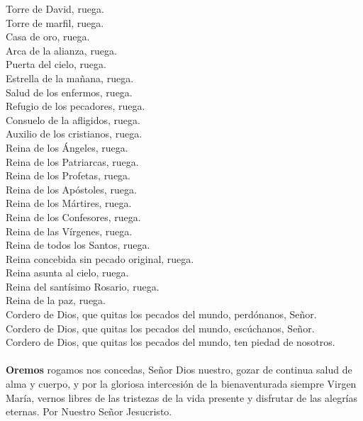 Torre de David, ruega.\\
Torre de marfil, ruega.\\
Casa de oro, ruega.\\
Arca de la alianza, ruega.\\
Puerta del cielo, ruega.\\
Estrella de la mañana, ruega.\\
Salud de los enfermos, ruega.\\
Refugio de los pecadores, ruega.\\
Consuelo de la afligidos, ruega.\\
Auxilio de los cristianos, ruega.\\
Reina de los Ángeles, ruega.\\
Reina de los Patriarcas, ruega.\\
Reina de los Profetas, ruega.\\
Reina de los Apóstoles, ruega.\\
Reina de los Mártires, ruega.\\
Reina de los Confesores, ruega.\\
Reina de las Vírgenes, ruega.\\
Reina de todos los Santos, ruega.\\
Reina concebida sin pecado original, ruega.\\
Reina asunta al cielo, ruega.\\
Reina del santísimo Rosario, ruega.\\
Reina de la paz, ruega.\\
Cordero de Dios, que quitas los pecados del mundo, perdónanos, Señor.\\
Cordero de Dios, que quitas los pecados del mundo, escúchanos, Señor.\\
Cordero de Dios, que quitas los pecados del mundo, ten piedad de nosotros.\\
\ruegapornosotrossalve\\

\textbf{Oremos}
 rogamos nos concedas, Señor Dios nuestro, gozar de continua salud de alma y cuerpo, y por la gloriosa intercesión de la
bienaventurada siempre Virgen María, vernos libres de las tristezas de la vida presente y disfrutar de las alegrías eternas.
Por Nuestro Señor Jesucristo. \\